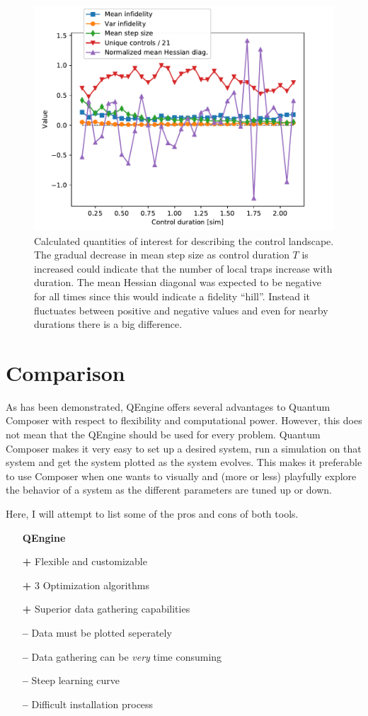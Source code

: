 \documentclass[a4paper, twocolumn]{revtex4-1}
\begin{document}
\begin{figure}
	\includegraphics[width=\columnwidth]{graphics/qengine/landscapes/Landscape.pdf}
	\caption{Calculated quantities of interest for describing the control landscape. The gradual decrease in mean step size as control duration $T$ is increased could indicate that the number of local traps increase with duration. The mean Hessian diagonal was expected to be negative for all times since this would indicate a fidelity ``hill''. Instead it fluctuates between positive and negative values and even for nearby durations there is a big difference. }
	\label{fig:qengine-landscape}
\end{figure}

\section{Comparison}\label{sec:comparison}
As has been demonstrated, QEngine offers several advantages to Quantum Composer with respect to flexibility and computational power. However, this does not mean that the QEngine should be used for every problem. Quantum Composer makes it very easy to set up a desired system, run a simulation on that system and get the system plotted as the system evolves. This makes it preferable to use Composer when one wants to visually and (more or less) playfully explore the behavior of a system as the different parameters are tuned up or down.

Here, I will attempt to list some of the pros and cons of both tools.
\begin{itemize}
	\item[] \textbf{QEngine} 
	\item[\bf+] Flexible and customizable
	\item[\bf+] 3 Optimization algorithms
	\item[\bf+] Superior data gathering capabilities
	\item[\bf{--}] Data must be plotted seperately
	\item[\bf{--}] Data gathering can be \textit{very} time consuming
	\item[\bf{--}] Steep learning curve
	\item[\bf{--}] Difficult installation process
\end{itemize}
\end{document}
